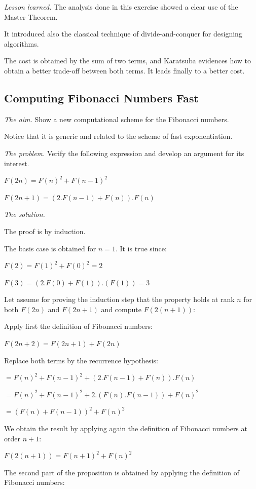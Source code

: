 \noindent \textit{Lesson learned.}
The analysis done in this exercise showed a clear use of the Master Theorem.

It introduced also the classical technique of divide-and-conquer for designing algorithms.

The cost is obtained by the sum of two terms, and Karatsuba evidences how to obtain a better trade-off between both terms.
It leads finally to a better cost. 


\subsection{Computing Fibonacci Numbers Fast}
\label{sec:FastFibo}

\noindent \textit{The aim.} 
Show a new computational scheme for the Fibonacci numbers.

Notice that it is generic and related to the scheme of fast exponentiation.
\medskip


\noindent \textit{The problem.} Verify the following expression and develop an argument for its interest.

$F(2n) = F(n)^2 + F(n-1)^2$

$F(2n+1) = (2.F(n-1) + F(n)).F(n)$
\medskip

\noindent \textit{The solution.}

The proof is by induction.

The basis case is obtained for $n=1$.
It is true since:

$F(2) = F(1)^2+F(0)^2 = 2$

$F(3) = (2.F(0)+F(1)).(F(1)) = 3$
\medskip

Let assume for proving the induction step that the property holds at rank $n$ for both $F(2n)$ and $F(2n+1)$ and compute $F(2(n+1))$:

Apply first the definition of Fibonacci numbers: 

$F(2n+2) = F(2n+1)+F(2n)$ 

Replace both terms by the recurrence hypothesis:

$= F(n)^2 + F(n-1)^2 + (2.F(n-1) + F(n)).F(n)$

$= F(n)^2 + F(n-1)^2 + 2.(F(n).F(n-1)) + F(n)^2$

$= (F(n) + F(n-1))^2 + F(n)^2$

We obtain the result by applying again the definition of Fibonacci numbers at order $n+1$:

$F(2(n+1)) = F(n+1)^2 + F(n)^2$
\medskip

The second part of the proposition is obtained by applying the definition of Fibonacci numbers:

